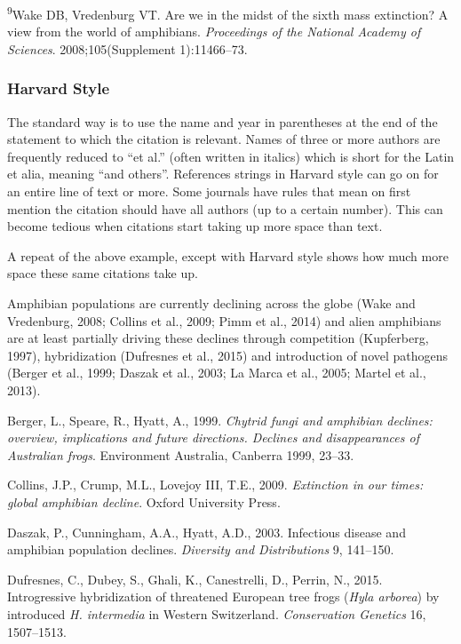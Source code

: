 \documentclass[
]{krantz}
\renewenvironment{quote}{\begin{VF}}{\end{VF}}
\begin{document}
\textsuperscript{9}Wake DB, Vredenburg VT. Are we in the midst of the sixth mass extinction? A view from the world of amphibians. \emph{Proceedings of the National Academy of Sciences}. 2008;105(Supplement 1):11466--73.

\hypertarget{harvard-style}{%
\subsubsection{Harvard Style}\label{harvard-style}}

The standard way is to use the name and year in parentheses at the end of the statement to which the citation is relevant. Names of three or more authors are frequently reduced to ``et al.'' (often written in italics) which is short for the Latin et alia, meaning ``and others''. References strings in Harvard style can go on for an entire line of text or more. Some journals have rules that mean on first mention the citation should have all authors (up to a certain number). This can become tedious when citations start taking up more space than text.

A repeat of the above example, except with Harvard style shows how much more space these same citations take up.

\begin{quote}
Amphibian populations are currently declining across the globe (Wake and Vredenburg, 2008; Collins et al., 2009; Pimm et al., 2014) and alien amphibians are at least partially driving these declines through competition (Kupferberg, 1997), hybridization (Dufresnes et al., 2015) and introduction of novel pathogens (Berger et al., 1999; Daszak et al., 2003; La Marca et al., 2005; Martel et al., 2013).
\end{quote}

Berger, L., Speare, R., Hyatt, A., 1999. \emph{Chytrid fungi and amphibian declines: overview, implications and future directions. Declines and disappearances of Australian frogs}. Environment Australia, Canberra 1999, 23--33.

Collins, J.P., Crump, M.L., Lovejoy III, T.E., 2009. \emph{Extinction in our times: global amphibian decline}. Oxford University Press.

Daszak, P., Cunningham, A.A., Hyatt, A.D., 2003. Infectious disease and amphibian population declines. \emph{Diversity and Distributions} 9, 141--150.

Dufresnes, C., Dubey, S., Ghali, K., Canestrelli, D., Perrin, N., 2015. Introgressive hybridization of threatened European tree frogs (\emph{Hyla arborea}) by introduced \emph{H. intermedia} in Western Switzerland. \emph{Conservation Genetics} 16, 1507--1513.
\end{document}
